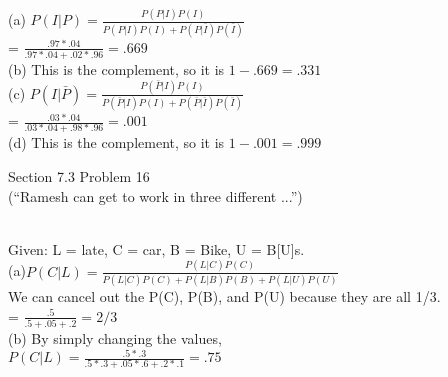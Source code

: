 \documentclass[11pt]{exam}
\begin{document}
\begin{questions}
\begin{solution}
(a) $P(I | P) = \frac{P(P|I) P(I)}{P(P|I)P(I) + P(P|\bar{I})P(\bar{I})}$ \\
= $\frac{.97 * .04}{.97 * .04 + .02 * .96} = .669$ \\
(b) This is the complement, so it is $1 - .669 = .331$ \\
(c) $P(I | \bar{P}) = \frac{P(\bar{P}|I) P(I)}{P(\bar{P}|I)P(I) + P(\bar{P}|\bar{I})P(\bar{I})}$ \\
= $\frac{.03 * .04}{.03 * .04 + .98 * .96} = .001$ \\
(d) This is the complement, so it is $1 - .001 = .999$
\end{solution}
\question[4] Section 7.3 Problem 16\\
(“Ramesh can get to work in three different ...”) 
\begin{solution}\\
Given: L = late, C = car, B = Bike, U = B[U]s. \\
(a)$P(C | L) = \frac{P(L|C)P(C)}{P(L|C)P(C) + P(L|B)P(B) + P(L|U)P(U)}$ \\
We can cancel out the P(C), P(B), and P(U) because they are all 1/3. \\
= $\frac{.5}{.5 + .05 + .2} = 2/3$ \\
(b) By simply changing the values, \\
$P(C | L) = \frac{.5 * .3}{.5*.3 + .05*.6 + .2*.1} = .75$

\end{solution}
\end{questions}
\end{document}
